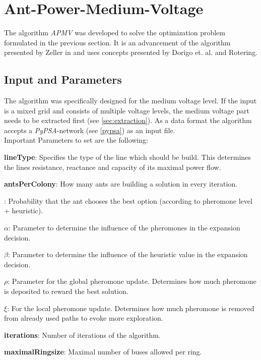 

\section{Ant-Power-Medium-Voltage}\label{sec:antpowermv}
The algorithm \textit{APMV} was developed to solve the optimization problem formulated in the previous section. It is an advancement of the algorithm presented by Zeller in \cite{zeller2021planung} and uses concepts presented by Dorigo et. al. and Rotering.


\subsection{Input and Parameters}\label{parameters}
The algorithm was specifically designed for the medium voltage level. If the input is a mixed grid and consists of multiple voltage levels, the medium voltage part needs to be extracted first (see \ref{sec:extraction}). As a data format the algorithm accepts a \textit{PyPSA}-network (see \ref{pypsa}) as an input file.\\
Important Parameters to set are the following:
\begin{itemize}
	\setlength\itemsep{-0.8em}
	\item \textbf{lineType}: Specifies the type of the line which should be build. This determines the lines resistance, reactance and capacity of its maximal power flow.
	\item \textbf{antsPerColony}: How many ants are building a solution in every iteration.
	\item {: Probability that the ant chooses the best option (according to pheromone level + heuristic).
	\item \textbf{$\alpha$}: Parameter to determine the influence of the pheromones in the expansion decision.
	\item \textbf{$\beta$}: Parameter to determine the influence of the heuristic value in the expansion decision.
	\item \textbf{$\rho$}: Parameter for the global pheromone update. Determines how much pheromone is deposited to reward the best solution.
	\item \textbf{$\xi$}: For the local pheromone update. Determines how much pheromone is removed from already used paths to evoke more exploration.}
	\item \textbf{iterations}: Number of iterations of the algorithm.
	\item \textbf{maximalRingsize}: Maximal number of buses allowed per ring.
\end{itemize}


